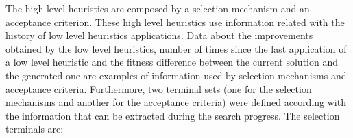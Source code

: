 \documentclass[conference]{IEEEtran}
\begin{document}







 The high level heuristics are composed by a selection mechanism and an acceptance criterion. These high level heuristics use information related with the history of low level heuristics applications. Data about the improvements obtained by the low level heuristics, number of times since the last application of a low level heuristic and the fitness difference between the current solution and the generated one are examples of information used by selection mechanisms and acceptance criteria.  Furthermore, two terminal sets (one for the selection mechanisms and another for the acceptance criteria) were defined according with the information that can be extracted during the search progress. The selection terminals are:

\end{document}
